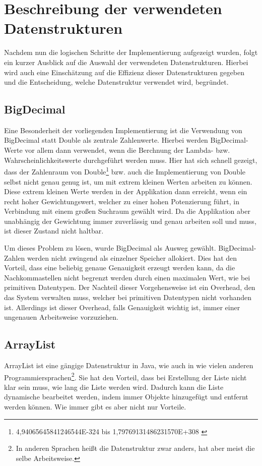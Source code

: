 \section{Beschreibung der verwendeten Datenstrukturen}
Nachdem nun die logischen Schritte der Implementierung aufgezeigt wurden, folgt ein kurzer Ausblick auf die Auswahl der verwendeten Datenstrukturen. Hierbei wird auch eine Einschätzung auf die Effizienz dieser Datenstrukturen gegeben und die Entscheidung, welche Datenstruktur verwendet wird, begründet.

\subsection{BigDecimal}
Eine Besonderheit der vorliegenden Implementierung ist die Verwendung von BigDecimal statt Double als zentrale Zahlenwerte. Hierbei werden BigDecimal-Werte vor allem dann verwendet, wenn die Berchnung der Lambda- bzw. Wahrscheinlichkeitswerte durchgeführt werden muss. Hier hat sich schnell gezeigt, dass der Zahlenraum von Double\footnote{4,94065645841246544E-324 bis 1,79769131486231570E+308 \cite{Ullenboom2011}} bzw. auch die Implementierung von Double selbst nicht genau genug ist, um mit extrem kleinen Werten arbeiten zu können. Diese extrem kleinen Werte werden in der Applikation dann erreicht, wenn ein recht hoher Gewichtungswert, welcher zu einer hohen Potenzierung führt, in Verbindung mit einem großen Suchraum gewählt wird. Da die Applikation aber unabhängig der Gewichtung immer zuverlässig und genau arbeiten soll und muss, ist dieser Zustand nicht haltbar.

Um dieses Problem zu lösen, wurde BigDecimal als Ausweg gewählt. BigDecimal-Zahlen werden nicht zwingend als einzelner Speicher allokiert. Dies hat den Vorteil, dass eine beliebig genaue Genauigkeit erzeugt werden kann, da die Nachkommastellen nicht begrenzt werden durch einen maximalen Wert, wie bei primitiven Datentypen. Der Nachteil dieser Vorgehensweise ist ein Overhead, den das System verwalten muss, welcher bei primitiven Datentypen nicht vorhanden ist. Allerdings ist dieser Overhead, falls Genauigkeit wichtig ist, immer einer ungenauen Arbeitsweise vorzuziehen.

\subsection{ArrayList}
ArrayList ist eine gängige Datenstruktur in Java, wie auch in wie vielen anderen Programmiersprachen\footnote{In anderen Sprachen heißt die Datenstruktur zwar anders, hat aber meist die selbe Arbeitsweise.}. Sie hat den Vorteil, dass bei Erstellung der Liste nicht klar sein muss, wie lang die Liste werden wird. Dadurch kann die Liste dynamische bearbeitet werden, indem immer Objekte hinzugefügt und entfernt werden können. Wie immer gibt es aber nicht nur Vorteile. 

